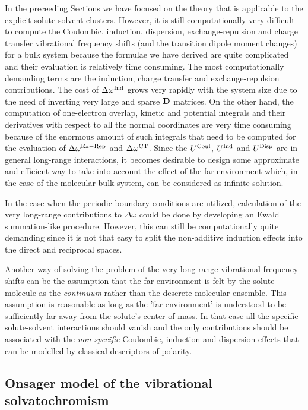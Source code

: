 \documentclass[a4paper,titlepage,twoside,fleqn,12pt]{book}
\begin{document}
\begin{refsection}
In the preceeding Sections we have focused on the
theory that is applicable to the explicit solute\hyp{}solvent
clusters. However, it is still computationally very difficult 
to compute the Coulombic, induction, dispersion, exchange\hyp{}repulsion
and charge transfer vibrational frequency shifts (and the transition dipole moment changes)
for a bulk system because the formulae we have derived are quite
complicated and their evaluation is relatively time consuming. The most computationally
demanding terms are the induction, charge transfer and exchange\hyp{}repulsion contributions.
The cost of $\Delta\omega^{\rm Ind}$ grows very rapidly with the system size
due to the need of inverting very large and sparse $\bf D$ matrices.
On the other hand, the computation of one\hyp{}electron overlap, kinetic
and potential integrals and their derivatives with respect to all the normal 
coordinates are very time consuming because of the enormous amount of such integrals
that need to be computed for the evaluation of $\Delta\omega^{\rm Ex-Rep}$ and $\Delta\omega^{\rm CT}$.
Since the $U^{\rm Coul}$, $U^{\rm Ind}$ and $U^{\rm Disp}$
are in general long\hyp{}range interactions, it becomes desirable
to design some approximate and efficient way to take into account the
effect of the far environment which, in the case of the molecular bulk 
system, can be considered as infinite solution.

In the case when the periodic boundary conditions are utilized, 
calculation of the very long\hyp{}range contributions to $\Delta\omega$ 
could be done by developing an Ewald summation\hyp{}like procedure.
However, this can still be computationally quite demanding since it is
not that easy to split the non\hyp{}additive induction effects
into the direct and reciprocal spaces.

Another way of solving the problem of the very long\hyp{}range
vibrational frequency shifts can be the assumption that the
far environment is felt by the solute molecule as the \emph{continuum}
rather than the descrete molecular ensemble. This assumption
is reasonable as long as the 'far environment'
is understood to be sufficiently far away from the solute's
center of mass. In that case all the specific solute\hyp{}solvent
interactions should vanish and the only contributions should be
associated with the \emph{non\hyp{}specific} Coulombic, induction and dispersion
effects that can be modelled by classical descriptors of polarity.

\subsection{Onsager model of the vibrational solvatochromism}


\end{refsection}
\end{document}
